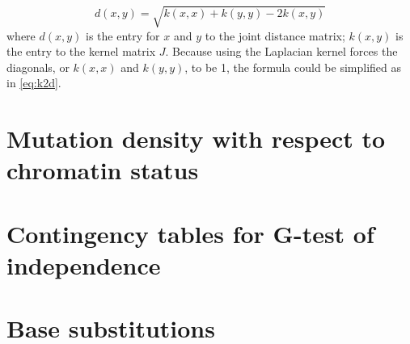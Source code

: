 \begin{equation}
    d(x,y) = \sqrt{k(x,x) + k(y,y) - 2k(x,y)} 
    \label{eq:k2d_ori}
\end{equation}
where $d(x,y)$ is the entry for $x$ and $y$ to the joint distance matrix; $k(x,y)$ is the entry to the kernel matrix $J$. Because using the Laplacian kernel forces the diagonals, or $k(x,x)$ and $k(y,y)$, to be 1, the formula could be simplified as in \ref{eq:k2d}.

\newpage
\section{Mutation density with respect to chromatin status}



\newpage
\section{Contingency tables for G-test of independence}\label{apdx:g-test}



\newpage
\section{Base substitutions}





